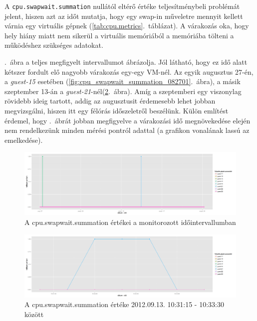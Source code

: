 \documentclass[a4paper,10pt,titlepage]{article}
\begin{document}
A \texttt{cpu.swapwait.summation} nullától eltérő értéke teljesítménybeli problémát jelent, hiszen azt az időt mutatja, hogy egy swap-in műveletre mennyit kellett várnia egy virtuális gépnek (\ref{tab:cpu.metrics}.~táblázat). A várakozás oka, hogy hely hiány miatt nem sikerül a virtuális memóriából a memóriába tölteni a működéshez szükséges adatokat.

.~ábra a teljes megfigyelt intervallumot ábrázolja. Jól látható, hogy ez idő alatt kétszer fordult elő nagyobb várakozás egy-egy VM-nél. Az egyik augusztus 27-én, a \textit{guest-15} esetében (\ref{fig:cpu_swapwait_summation_082701}.~ábra), a másik szeptember 13-án a \textit{guest-21}-nél(\ref{fig:cpu_swapwait_summation_0913}.~ábra). Amíg a szeptemberi egy viszonylag rövidebb ideig tartott, addig az augusztusit érdemesebb lehet jobban megvizsgálni, hiszen itt egy félórás időszeletről beszélünk. Külön említést érdemel, hogy .~ábrát jobban megfigyelve a várakozási idő megnövekedése elején nem rendelkezünk minden mérési pontról adattal (a grafikon vonalának lassú az emelkedése).

\begin{figure}[ht!]
\centering
\includegraphics[width=1.00\textwidth]{figures/cpu_swapwait_summation-20120826230140-20120924083120.png}
\caption{A cpu.swapwait.summation értékei a monitorozott időintervallumban \label{fig:cpu_swapwait_summation}}
\end{figure}

\begin{figure}[ht!]
\centering
\includegraphics[width=1.00\textwidth]{figures/cpu_swapwait_summation-20120913103115-20120913103330.png}
\caption{A cpu.swapwait.summation értéke 2012.09.13. 10:31:15 - 10:33:30 között \label{fig:cpu_swapwait_summation_0913}}
\end{figure}
\end{document}
